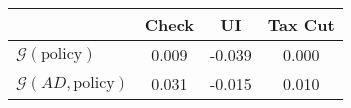 \begin{tabular}{@{}lccc@{}} 
\toprule 
                          & Check      & UI    & Tax Cut    \\  \midrule 
$\mathcal{G}(\text{policy})$ & 0.009  & -0.039  & 0.000     \\ 
$\mathcal{G}(AD,\text{policy})$ & 0.031  & -0.015  & 0.010     \\ 
\end{tabular}  
